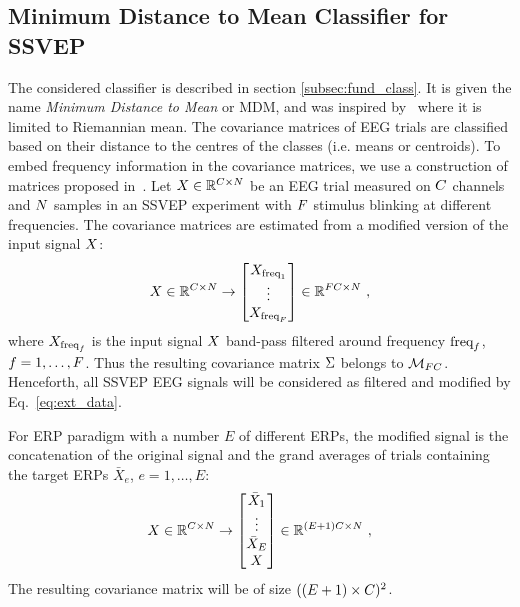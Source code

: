 \subsection{Minimum Distance to Mean Classifier for SSVEP}
\label{subsec:mdm}
The considered classifier is described in section \ref{subsec:fund_class}. 
It is given the name \emph{Minimum Distance to Mean} or MDM, and was inspired by~\citep{barachant_multiclass_2012} where it is limited to Riemannian mean.
The covariance matrices of EEG trials are classified based on their distance to the centres of the classes (i.e. means or centroids).
To embed frequency information in the covariance matrices, we use a construction of matrices proposed in~\citep{congedo_new_2013}.
Let $\X \in \Re^{\dc\times\dt}$ be an EEG trial measured on $\dc$ channels and $\dt$ samples in an SSVEP experiment with $\dF$ stimulus blinking at different frequencies.  
The covariance matrices are estimated from a modified version of the input signal $\X$: 
\begin{equation}
	\X \in \Re^{\dc \times \dt} \rightarrow 	
	\begin{bmatrix}
		X_{\text{freq}_1}\\ \vdots \\ X_{\text{freq}_{\dF}} \\
	\end{bmatrix}
	\in \Re^{\dF\dc \times \dt} \ ,
	\label{eq:ext_data}
\end{equation}
where $X_{\text{freq}_\df}$ is the input signal $\X$ band-pass filtered around frequency $\text{freq}_\df$, $\df=1, \ldots, \dF$. 
Thus the resulting covariance matrix $\P$ belongs to $\mathcal{M}_{\dF\dc}$. 
Henceforth, all SSVEP EEG signals will be considered as filtered and modified by Eq.~\eqref{eq:ext_data}.

For ERP paradigm with a number $E$ of different ERPs, the modified signal is the concatenation of the original signal and the grand averages of trials containing the target ERPs $\bar{X}_e$, $e=1, \ldots, E$:
\begin{equation}
\X \in \Re^{\dc \times \dt} \rightarrow 	
\begin{bmatrix}
 \bar{X}_1\\ 
\vdots \\
\bar{X}_E \\
X\\
\end{bmatrix}
\in \Re^{(E+1)\dc \times \dt} \ ,
\label{eq:ext_data_erp}
\end{equation}
The resulting covariance matrix will be of size $((E+1) \times \dc)^2$. 

